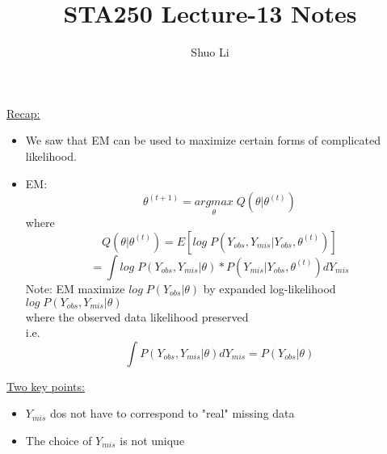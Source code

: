 \documentclass[12pt]{article}
\begin{document}
\title{STA250 Lecture-13 Notes}
\author{Shuo Li}
\maketitle

\underline{Recap:}
\begin{itemize}
\item We saw that EM can be used to maximize certain forms of complicated likelihood. 
\item EM:  \\
$$\theta^{(t+1)}=\underset{\theta}{argmax}\; Q(\theta|\theta^{(t)})$$
where $$Q(\theta|\theta^{(t)})=E[log\;P(Y_{obs}, Y_{mis}|Y_{obs}, \theta^{(t)})]$$
$$=\int log\;P(Y_{obs}, Y_{mis}|\theta)*P(Y_{mis}|Y_{obs}, \theta^{(t)})dY_{mis}$$
Note: EM maximize $log\;P(Y_{obs}|\theta)$ by expanded log-likelihood $log\;P(Y_{obs}, Y_{mis}|\theta)$\\
where the observed data likelihood preserved\\
i.e. $$\int P(Y_{obs}, Y_{mis}|\theta)dY_{mis}=P(Y_{obs}|\theta)$$
\end{itemize}

\underline {Two key points:}
\begin{itemize}
\item $Y_{mis}$ dos not have to correspond to "real" missing data
\item The choice of $Y_{mis}$ is not unique
\end{itemize}
\end{document}
